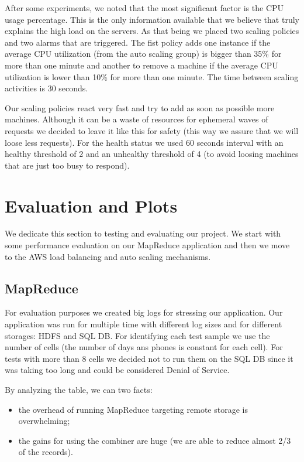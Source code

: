\documentclass{article}
\begin{document}
After some experiments, we noted that the most significant factor is the CPU usage percentage. This is the only information available that we believe that truly explains the high load on the servers. As that being we placed two scaling policies and two alarms that are triggered. The fist policy adds one instance if the average CPU utilization (from the auto scaling group) is bigger than 35\% for more than one minute and another to remove a machine if the average CPU utilization is lower than 10\% for more than one minute. The time between scaling activities is 30 seconds.

Our scaling policies react very fast and try to add as soon as possible more machines. Although it can be a waste of resources for ephemeral waves of requests we decided to leave it like this for safety (this way we assure that we will loose less requests). For the health status we used 60 seconds interval with an healthy threshold of 2 and an unhealthy threshold of 4 (to avoid loosing machines that are just too busy to respond). 

\section{Evaluation and Plots}
We dedicate this section to testing and evaluating our project. We start with some performance evaluation on our MapReduce application and then we move to the AWS load balancing and auto scaling mechanisms.  

\subsection{MapReduce}

For evaluation purposes we created big logs for stressing our application. Our application was run for multiple time with different log sizes and for different storages: HDFS and SQL DB. For identifying each test sample we use the number of cells (the number of days ans phones is constant for each cell). For tests with more than 8 cells we decided not to run them on the SQL DB since it was taking too long and could be considered Denial of Service.

By analyzing the table, we can two facts:

\begin{itemize}
\item the overhead of running MapReduce targeting remote storage is overwhelming;
\item the gains for using the combiner are huge (we are able to reduce almost 2/3 of the records).
\end{itemize}
\end{document}

